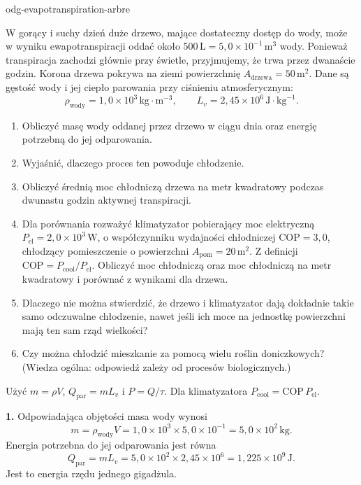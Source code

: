 \begin{exo}{odg-evapotranspiration-arbre}

W gorący i suchy dzień duże drzewo, mające dostateczny dostęp do wody, może w wyniku ewapotranspiracji oddać około $500\,\text{L}=5{,}0\times10^{-1}\,\text{m}^3$ wody. Ponieważ transpiracja zachodzi głównie przy świetle, przyjmujemy, że trwa przez dwanaście godzin. Korona drzewa pokrywa na ziemi powierzchnię $A_{\text{drzewa}}=50\,\text{m}^2$. Dane są gęstość wody i jej ciepło parowania przy ciśnieniu atmosferycznym:
\[
\rho_{\text{wody}}=1{,}0\times10^3\,\text{kg}\!\cdot\!\text{m}^{-3},
\qquad L_v=2{,}45\times10^6\,\text{J}\!\cdot\!\text{kg}^{-1}.
\]

\begin{enumerate}
  \item Obliczyć masę wody oddanej przez drzewo w ciągu dnia oraz energię potrzebną do jej odparowania.
  \item Wyjaśnić, dlaczego proces ten powoduje chłodzenie.
  \item Obliczyć średnią moc chłodniczą drzewa na metr kwadratowy podczas dwunastu godzin aktywnej transpiracji.
  \item Dla porównania rozważyć klimatyzator pobierający moc elektryczną $P_{\mathrm{el}}=2{,}0\times10^3\,\text{W}$, o współczynniku wydajności chłodniczej $\mathrm{COP}=3{,}0$, chłodzący pomieszczenie o powierzchni $A_{\text{pom}}=20\,\text{m}^2$. Z definicji $\mathrm{COP}=P_{\text{cool}}/P_{\mathrm{el}}$. Obliczyć moc chłodniczą oraz moc chłodniczą na metr kwadratowy i porównać z wynikami dla drzewa.
  \item Dlaczego nie można stwierdzić, że drzewo i klimatyzator dają dokładnie takie samo odczuwalne chłodzenie, nawet jeśli ich moce na jednostkę powierzchni mają ten sam rząd wielkości?
  \item Czy można chłodzić mieszkanie za pomocą wielu roślin doniczkowych? (Wiedza ogólna: odpowiedź zależy od procesów biologicznych.)
\end{enumerate}

\begin{indication}
Użyć $m=\rho V$, $Q_{\mathrm{par}}=mL_v$ i $P=Q/\tau$. Dla klimatyzatora $P_{\text{cool}}=\mathrm{COP}\,P_{\mathrm{el}}$.
\end{indication}

\begin{solution}
\textbf{1.} Odpowiadająca objętości masa wody wynosi
\[
m=\rho_{\text{wody}}V
=1{,}0\times10^3\times5{,}0\times10^{-1}
=5{,}0\times10^2\,\text{kg}.
\]
Energia potrzebna do jej odparowania jest równa
\[
Q_{\mathrm{par}}=mL_v
=5{,}0\times10^2\times2{,}45\times10^6
=1{,}225\times10^9\,\text{J}.
\]
Jest to energia rzędu jednego gigadżula.


\end{solution}
\end{exo}

